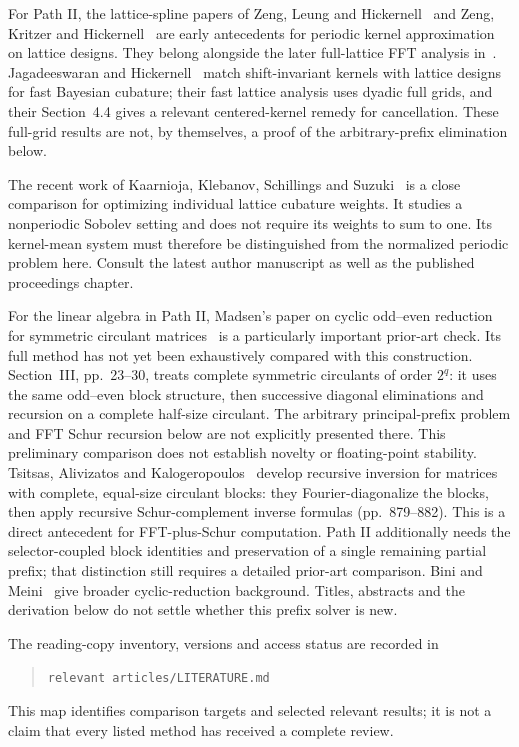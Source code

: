 \documentclass[11pt]{article}
\begin{document}
For Path II, the lattice-spline papers of Zeng, Leung and
Hickernell~\cite{ZLH06} and Zeng, Kritzer and Hickernell~\cite{ZKH09}
are early antecedents for periodic kernel approximation on lattice
designs. They belong alongside the later full-lattice FFT analysis
in~\cite{KKKNS22}. Jagadeeswaran and Hickernell~\cite{JH19} match
shift-invariant kernels with lattice designs for fast Bayesian cubature;
their fast lattice analysis uses dyadic full grids, and their
Section~4.4 gives a relevant centered-kernel remedy for cancellation.
These full-grid results are not, by themselves, a proof of the
arbitrary-prefix elimination below.

The recent work of Kaarnioja, Klebanov, Schillings and
Suzuki~\cite{KKSS26} is a close comparison for optimizing individual
lattice cubature weights. It studies a nonperiodic Sobolev setting
and does not require its weights to sum to one. Its kernel-mean
system must therefore be distinguished from the normalized periodic
problem here. Consult the latest author manuscript as well as the
published proceedings chapter.

For the linear algebra in Path II, Madsen's paper on cyclic odd--even
reduction for symmetric circulant matrices~\cite{Madsen83} is a
particularly important prior-art check. Its full method has not yet
been exhaustively compared with this construction. Section~III,
pp.~23--30, treats complete symmetric circulants of order $2^q$:
it uses the same odd--even block structure, then successive diagonal
eliminations and recursion on a complete half-size circulant.
The arbitrary principal-prefix problem and FFT Schur recursion below
are not explicitly presented there. This preliminary comparison does
not establish novelty or floating-point stability. Tsitsas, Alivizatos and
Kalogeropoulos~\cite{TAK07} develop recursive inversion for matrices
with complete, equal-size circulant blocks: they Fourier-diagonalize
the blocks, then apply recursive Schur-complement inverse formulas
(pp.~879--882). This is a direct antecedent for FFT-plus-Schur
computation. Path II additionally needs the selector-coupled block
identities and preservation of a single remaining partial prefix;
that distinction still requires a detailed prior-art comparison.
Bini and Meini~\cite{BM09} give broader cyclic-reduction
background. Titles, abstracts and the derivation below do not settle
whether this prefix solver is new.

The reading-copy inventory, versions and access status are recorded in
\begin{quote}\small\texttt{relevant articles/LITERATURE.md}\end{quote}
This map identifies
comparison targets and selected relevant results; it is not a claim
that every listed method has received a complete review.
\end{document}

